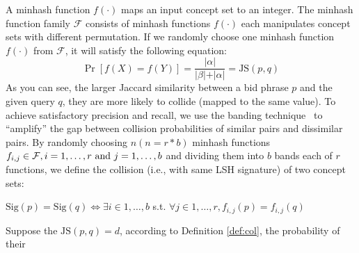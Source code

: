A minhash function $f(\cdot)$ maps an input concept set to an integer.  The minhash function family
$\mathcal{F}$ consists of minhash functions
$f(\cdot)$ each manipulates concept sets with different permutation. 
If we randomly choose one minhash function $f(\cdot)$ from
$\mathcal{F}$, it will satisfy the following equation:
\begin{equation}
\label{eqn:minhash}
\Pr[f(X)=f(Y)]=\frac{\vert\alpha\vert}{\vert\beta\vert+\vert\alpha\vert}=\text{JS}(p,q)
\end{equation}
As you can see, the larger Jaccard similarity between a bid phrase $p$ and the
given query $q$, they are more likely to collide (mapped to the same value).
To achieve satisfactory precision and recall, we use the banding
technique~\cite{raja:massivedatasets} to ``amplify'' the gap between 
collision probabilities of similar pairs and dissimilar pairs. By
randomly choosing $n(n=r\ast b)$ minhash functions
$f_{i,j}\in\mathcal{F},i=1,\ldots,r\textnormal{ and }j=1,\ldots,b$ and
dividing them into $b$ bands each of $r$ functions, we define the
collision (i.e., with same LSH signature) of two concept sets:
\begin{definition}
\label{def:col}
$\text{Sig}(p)=\text{Sig}(q)\Leftrightarrow{}\exists i\in 1,\ldots,b$ s.t. $\forall
j\in 1,\ldots,r,f_{i,j}(p)=f_{i,j}(q)$
\end{definition}
Suppose the $\text{JS}(p,q)=d$, according to Definition \ref{def:col}, the probability of their
